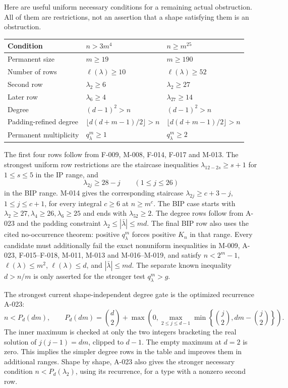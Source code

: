 Here are useful uniform necessary conditions for a remaining
actual obstruction. All of them are restrictions, not an
assertion that a shape satisfying them is an obstruction.
\begin{center}
\renewcommand{\arraystretch}{1.2}
\begin{tabular}{@{}p{}p{}p{}@{}}
\toprule
Condition & \(n>3m^4\) & \(n\geq m^{25}\)\\
\midrule
Permanent size & \(m\geq19\) & \(m\geq190\)\\
Number of rows & \(\ell(\lambda)\geq10\) & \(\ell(\lambda)\geq52\)\\
Second row & \(\lambda_2\geq6\) & \(\lambda_2\geq27\)\\
Later row & \(\lambda_6\geq4\) & \(\lambda_{27}\geq14\)\\
Degree & \((d-1)^2>n\) & \((d-1)^2>n\)\\
Padding-refined degree & \(\lfloor d(d+m-1)/2\rfloor>n\) & \(\lfloor d(d+m-1)/2\rfloor>n\)\\
Permanent multiplicity & \(q^m_\lambda\geq1\) & \(q^m_\lambda\geq2\)\\
\bottomrule
\end{tabular}
\end{center}
The first four rows follow from F-009, M-008, F-014, F-017 and M-013.
The strongest uniform row restrictions are the staircase inequalities
\(\lambda_{12-2s}\geq s+1\) for \(1\leq s\leq5\) in
the IP range, and
\[
                  \lambda_{2j}\geq28-j\qquad(1\leq j\leq26)
\]
in the BIP range. M-014 gives the corresponding staircase
\(\lambda_{2j}\geq c+3-j\), \(1\leq j\leq c+1\),
for every integral \(c\geq6\) at \(n\geq m^c\).
The BIP case starts with
\(\lambda_2\geq27,\lambda_4\geq26,\lambda_6\geq25\)
and ends with \(\lambda_{52}\geq2\). The degree rows follow
from A-023 and the padding constraint
\(\lambda_2\leq|\bar\lambda|\leq md\). The final BIP
row also uses the cited no-occurrence theorem: positive
\(q^m_\lambda\) forces positive \(K_n\) in that range.
Every candidate must additionally fail the exact nonuniform
inequalities in M-009, A-023, F-015--F-018, M-011, M-013 and M-016--M-019,
and satisfy \(n<2^m-1\), \(\ell(\lambda)\leq m^2\),
\(\ell(\lambda)\leq d\), and \(|\bar\lambda|\leq md\).
The separate known inequality \(d>n/m\) is only asserted
for the stronger test \(q^m_\lambda>g\).

The strongest current shape-independent degree gate is the optimized
recurrence A-023:
\[
 n<P_d(dm),\qquad
 P_d(dm)=\binom d2+
 \max\!\left(0,\max_{2\leq j\leq d-1}
       \min\left\{\binom j2,dm-\binom j2\right\}\right).
\]
The inner maximum is checked at only the two integers bracketing
the real solution of \(j(j-1)=dm\), clipped to \(d-1\).
The empty maximum at \(d=2\) is zero. This implies the simpler
degree rows in the table and improves them in additional ranges.
Shape by shape, A-023 also gives the stronger necessary condition
\(n<P_d(\lambda_2)\), using its recurrence, for a type with a
nonzero second row.


